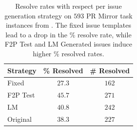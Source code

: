\begin{table}[h]
    \centering
    \begin{tabular}{l|cc}
\toprule
Strategy & \% Resolved & \# Resolved \\
\midrule
Fixed        & $27.3$ & $162$ \\
F2P Test     & $45.7$ & $271$ \\
LM           & $40.8$ & $242$ \\
Original     & $38.3$ & $227$ \\
\bottomrule
    \end{tabular}
    \caption{
Resolve rates with respect per issue generation strategy on $593$ PR Mirror task instances from \bugs{}.
The fixed issue templates lead to a drop in the \% resolve rate, while F2P Test and LM Generated issues induce higher \% resolved rates.
    }
    \label{tab:issue_gen_resolve_rate}
\end{table}